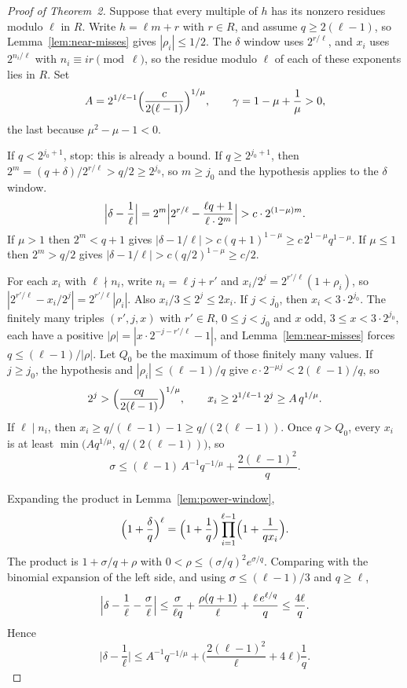 \documentclass[11pt]{article}
\begin{document}
\begin{proof}[Proof of Theorem~2]
Suppose that every multiple of $h$ has its nonzero residues modulo $\ell$ in $R$.
Write $h = \ell m + r$ with $r \in R$, and assume $q \ge 2(\ell-1)$, so Lemma~\ref{lem:near-misses} gives $|\rho_i| \le 1/2$.
The $\delta$ window uses $2^{r/\ell}$, and $x_i$ uses $2^{n_i/\ell}$ with $n_i \equiv ir \pmod{\ell}$, so the residue modulo $\ell$ of each of these exponents lies in $R$.
Set
\[
A = 2^{1/\ell - 1}\Bigl(\frac{c}{2(\ell-1)}\Bigr)^{1/\mu},
\qquad
\gamma = 1 - \mu + \frac1\mu > 0,
\]
the last because $\mu^2 - \mu - 1 < 0$.

If $q < 2^{j_0+1}$, stop: this is already a bound.
If $q \ge 2^{j_0+1}$, then $2^m = (q+\delta)/2^{r/\ell} > q/2 \ge 2^{j_0}$, so $m \ge j_0$ and the hypothesis applies to the $\delta$ window.
\[
\Bigl|\delta - \frac1\ell\Bigr|
= 2^m \Bigl| 2^{r/\ell} - \frac{\ell q + 1}{\ell \cdot 2^m} \Bigr|
> c \cdot 2^{(1-\mu)m}.
\]
If $\mu > 1$ then $2^m < q+1$ gives $|\delta - 1/\ell| > c(q+1)^{1-\mu} \ge c\, 2^{1-\mu} q^{1-\mu}$.
If $\mu \le 1$ then $2^m > q/2$ gives $|\delta - 1/\ell| > c(q/2)^{1-\mu} \ge c/2$.

For each $x_i$ with $\ell \nmid n_i$, write $n_i = \ell j + r'$ and $x_i/2^j = 2^{r'/\ell}(1+\rho_i)$, so $|2^{r'/\ell} - x_i/2^j| = 2^{r'/\ell}|\rho_i|$.
Also $x_i/3 \le 2^j \le 2x_i$.
If $j < j_0$, then $x_i < 3 \cdot 2^{j_0}$.
The finitely many triples $(r', j, x)$ with $r' \in R$, $0 \le j < j_0$ and $x$ odd, $3 \le x < 3 \cdot 2^{j_0}$, each have a positive $|\rho| = |x \cdot 2^{-j-r'/\ell} - 1|$, and Lemma~\ref{lem:near-misses} forces $q \le (\ell-1)/|\rho|$.
Let $Q_0$ be the maximum of those finitely many values.
If $j \ge j_0$, the hypothesis and $|\rho_i| \le (\ell-1)/q$ give $c \cdot 2^{-\mu j} < 2(\ell-1)/q$, so
\[
2^j > \Bigl(\frac{cq}{2(\ell-1)}\Bigr)^{1/\mu},
\qquad
x_i \ge 2^{1/\ell-1}\, 2^j \ge A\, q^{1/\mu}.
\]
If $\ell \mid n_i$, then $x_i \ge q/(\ell-1) - 1 \ge q/(2(\ell-1))$.
Once $q > Q_0$, every $x_i$ is at least $\min\bigl(A q^{1/\mu},\ q/(2(\ell-1))\bigr)$, so
\[
\sigma \le (\ell-1)\, A^{-1} q^{-1/\mu} + \frac{2(\ell-1)^2}{q}.
\]

Expanding the product in Lemma~\ref{lem:power-window},
\[
\Bigl(1 + \frac{\delta}{q}\Bigr)^\ell
= \Bigl(1 + \frac1q\Bigr)\prod_{i=1}^{\ell-1}\Bigl(1 + \frac1{qx_i}\Bigr).
\]
The product is $1 + \sigma/q + \rho$ with $0 < \rho \le (\sigma/q)^2 e^{\sigma/q}$.
Comparing with the binomial expansion of the left side, and using $\sigma \le (\ell-1)/3$ and $q \ge \ell$,
\[
\Bigl|\delta - \frac1\ell - \frac{\sigma}{\ell}\Bigr|
\le \frac{\sigma}{\ell q} + \frac{\rho(q+1)}{\ell} + \frac{\ell\, e^{\ell/q}}{q}
\le \frac{4\ell}{q}.
\]
Hence
\[
\bigl|\delta - \frac1\ell\bigr|
\le A^{-1} q^{-1/\mu} + \Biggl(\frac{2(\ell-1)^2}{\ell} + 4\ell\Biggr)\frac1q.
\]


\end{proof}
\end{document}
